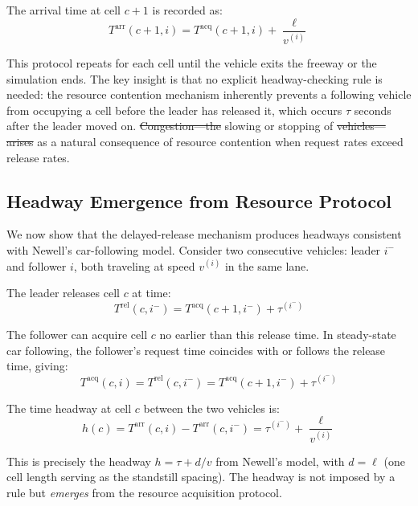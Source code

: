 \documentclass[review,authoryear]{elsarticle}
\newcommand{\Tacq}{T^{\text{acq}}}
\newcommand{\Tarr}{T^{\text{arr}}}
\newcommand{\Trel}{T^{\text{rel}}}
\providecommand{\DIFaddtex}[1]{{\protect\color{blue}\uwave{#1}}} %
\providecommand{\DIFdeltex}[1]{{\protect\color{red}\sout{#1}}}                      %
\providecommand{\DIFaddbegin}{} %
\providecommand{\DIFaddend}{} %
\providecommand{\DIFdelbegin}{} %
\providecommand{\DIFdelend}{} %
\providecommand{\DIFadd}[1]{\texorpdfstring{\DIFaddtex{#1}}{#1}} %
\providecommand{\DIFdel}[1]{\texorpdfstring{\DIFdeltex{#1}}{}} %
\newcommand{\DIFscaledelfig}{0.5}
\newlength{\DIFdelgraphicswidth} %
\newlength{\DIFdelgraphicsheight} %
\newcommand{\DIFaddincludegraphics}[2][]{{\color{blue}\fbox{\DIFOincludegraphics[#1]{#2}}}} %
\newcommand{\DIFdelincludegraphics}[2][]{%
\sbox{\DIFdelgraphicsbox}{\DIFOincludegraphics[#1]{#2}}%
\settoboxwidth{\DIFdelgraphicswidth}{\DIFdelgraphicsbox} %
\settoboxtotalheight{\DIFdelgraphicsheight}{\DIFdelgraphicsbox} %
\scalebox{\DIFscaledelfig}{%
\parbox[b]{\DIFdelgraphicswidth}{\usebox{\DIFdelgraphicsbox}\\[-\baselineskip] \rule{\DIFdelgraphicswidth}{0em}}\llap{\resizebox{\DIFdelgraphicswidth}{\DIFdelgraphicsheight}{%
\setlength{\unitlength}{\DIFdelgraphicswidth}%
\begin{picture}(1,1)%
\thicklines\linethickness{2pt} %
{\color[rgb]{1,0,0}\put(0,0){\framebox(1,1){}}}%
{\color[rgb]{1,0,0}\put(0,0){\line( 1,1){1}}}%
{\color[rgb]{1,0,0}\put(0,1){\line(1,-1){1}}}%
\end{picture}%
}\hspace*{3pt}}} %
} %
\DeclareRobustCommand{\DIFaddbegin}{\DIFOaddbegin \let\includegraphics\DIFaddincludegraphics} %
\DeclareRobustCommand{\DIFaddend}{\DIFOaddend \let\includegraphics\DIFOincludegraphics} %
\DeclareRobustCommand{\DIFdelbegin}{\DIFOdelbegin \let\includegraphics\DIFdelincludegraphics} %
\DeclareRobustCommand{\DIFdelend}{\DIFOaddend \let\includegraphics\DIFOincludegraphics} %
\begin{document}
The arrival time at cell $c+1$ is recorded as:
\begin{equation}
    \Tarr(c+1, i) = \Tacq(c+1, i) + \frac{\ell}{v^{(i)}}
    \label{eq:arrival}
\end{equation}

This protocol repeats for each cell until the vehicle exits the freeway or the simulation ends. The key insight is that no explicit headway-checking rule is needed: the resource contention mechanism inherently prevents a following vehicle from occupying a cell before the leader has released it, which occurs $\tau$ seconds after the leader moved on. \DIFdelbegin \DIFdel{Congestion---the }\DIFdelend \DIFaddbegin \DIFadd{Congestion, the }\DIFaddend slowing or stopping of \DIFdelbegin \DIFdel{vehicles---arises }\DIFdelend \DIFaddbegin \DIFadd{vehicles, arises }\DIFaddend as a natural consequence of resource contention when request rates exceed release rates.

\subsection{Headway Emergence from Resource Protocol}
\label{sec:headway}

We now show that the delayed-release mechanism produces headways consistent with Newell's car-following model. Consider two consecutive vehicles: leader $i^{-}$ and follower $i$, both traveling at speed $v^{(i)}$ in the same lane.

The leader releases cell $c$ at time:
\begin{equation}
    \Trel(c, i^{-}) = \Tacq(c+1, i^{-}) + \tau^{(i^{-})}
\end{equation}

The follower can acquire cell $c$ no earlier than this release time. In steady-state car following, the follower's request time coincides with or follows the release time, giving:
\begin{equation}
    \Tacq(c, i) = \Trel(c, i^{-}) = \Tacq(c+1, i^{-}) + \tau^{(i^{-})}
\end{equation}

The time headway at cell $c$ between the two vehicles is:
\begin{equation}
    h(c) = \Tarr(c, i) - \Tarr(c, i^{-}) = \tau^{(i^{-})} + \frac{\ell}{v^{(i)}}
    \label{eq:headway}
\end{equation}

This is precisely the headway $h = \tau + d/v$ from Newell's model, with $d = \ell$ (one cell length serving as the standstill spacing). The headway is not imposed by a rule but \emph{emerges} from the resource acquisition protocol.
\end{document}
